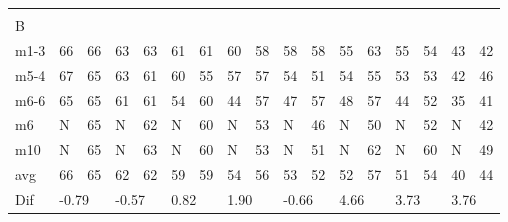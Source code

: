 \begin{table}[H]
\begin{tabular}{l|l|l|l|l|l|l|l|l|l|l|l|l|l|l|ll}
\multicolumn{17}{l}{ } \\   
B & \multicolumn{2}{l|}{} & \multicolumn{2}{l|}{} & \multicolumn{2}{l|}{} & \multicolumn{2}{l|}{} & \multicolumn{2}{l|}{} & \multicolumn{2}{l|}{}& \multicolumn{2}{l|}{}& \multicolumn{2}{l}{}     \\ \hline
m1-3   &    66    &    66   &   63    &   63    &    61   &   61     &   60     &   58       &    58   &    58     &    55   &     63      &      55   &    54   & \multicolumn{1}{l|}{43} &42  \\
m5-4   &    67    &    65   &   63    &  61     &    60     &  55    &   57     &    57     &  54     &     51     &   54   &     55       &     53    &    53   & \multicolumn{1}{l|}{42} &46  \\
m6-6   &   65      &   65      &   61   &  61   &   54    &   60     &    44    &    57      &   47   &     57     &     48    &    57     &     44     &   52  & \multicolumn{1}{l|}{35} &41  \\
m6   &   N     &      65   &    N  &     62  &    N    &   60   &   N   &    53      &   N  &      46    &   N    &      50    &     N   &     52  & \multicolumn{1}{l|}{N} & 42 \\
m10  &   N   &    65   &    N   &     63    &    N    &   60   &   N   &    53      &   N   &     51    &     N  &     62     &     N   &     60  & \multicolumn{1}{l|}{N} &49  \\ \hline
avg  &     66    &     65    &    62     &     62       &     59    &   59         &     54   &   56         &     53     &  52         &     52       &    57        &       51        &   54       & \multicolumn{1}{l|}{40} & 44\\ \hline
Dif & \multicolumn{2}{l|}{-0.79} & \multicolumn{2}{l|}{-0.57} & \multicolumn{2}{l|}{0.82} & \multicolumn{2}{l|}{1.90} & \multicolumn{2}{l|}{-0.66} & \multicolumn{2}{l|}{4.66}& \multicolumn{2}{l|}{3.73}& \multicolumn{2}{l}{3.76}       
\end{tabular}
\end{table}



